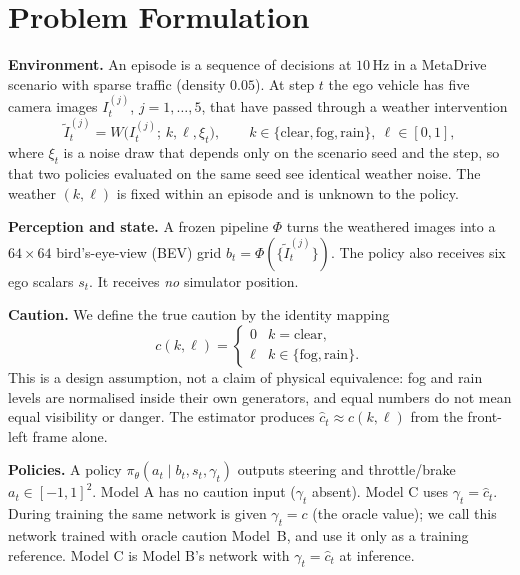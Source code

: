 \documentclass[conference]{IEEEtran}
\newcommand{\chat}{\hat{c}}
\begin{document}
\section{Problem Formulation}
\label{sec:problem}
\textbf{Environment.} An episode is a sequence of decisions at $10$\,Hz in a MetaDrive scenario with sparse traffic (density $0.05$). At step $t$ the ego vehicle has five camera images $I_t^{(j)}$, $j=1,\dots,5$, that have passed through a weather intervention
\begin{equation}
\tilde I_t^{(j)} = W\big(I_t^{(j)};\,k,\ell,\xi_t\big),\qquad k\in\{\text{clear},\text{fog},\text{rain}\},\ \ell\in[0,1],
\end{equation}
where $\xi_t$ is a noise draw that depends only on the scenario seed and the step, so that two policies evaluated on the same seed see identical weather noise. The weather $(k,\ell)$ is fixed within an episode and is unknown to the policy.

\textbf{Perception and state.} A frozen pipeline $\Phi$ turns the weathered images into a $64\times64$ bird's-eye-view (BEV) grid $b_t=\Phi(\{\tilde I_t^{(j)}\})$. The policy also receives six ego scalars $s_t$. It receives \emph{no} simulator position.

\textbf{Caution.} We define the true caution by the identity mapping
\begin{equation}
c(k,\ell)=\begin{cases}0 & k=\text{clear},\\ \ell & k\in\{\text{fog},\text{rain}\}.\end{cases}
\label{eq:caution}
\end{equation}
This is a design assumption, not a claim of physical equivalence: fog and rain levels are normalised inside their own generators, and equal numbers do not mean equal visibility or danger. The estimator produces $\chat_t\approx c(k,\ell)$ from the front-left frame alone.

\textbf{Policies.} A policy $\pi_\theta(a_t\mid b_t,s_t,\gamma_t)$ outputs steering and throttle/brake $a_t\in[-1,1]^2$. Model A has no caution input ($\gamma_t$ absent). Model C uses $\gamma_t=\chat_t$. During training the same network is given $\gamma_t=c$ (the oracle value); we call this network trained with oracle caution Model~B, and use it only as a training reference. Model C is Model B's network with $\gamma_t=\chat_t$ at inference.
\end{document}

